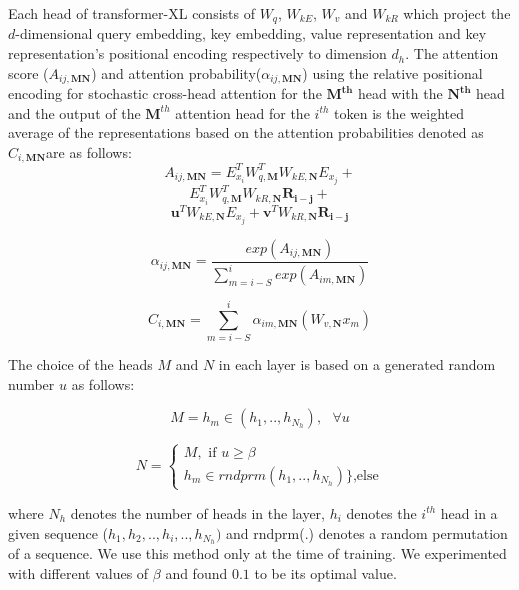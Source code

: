 \documentclass[11pt]{article}
\begin{document}
Each head of transformer-XL consists of $W_q$, $W_{kE}$, $W_v$ and $W_{kR}$ which project the $d$-dimensional query embedding, key embedding, value representation and key representation's positional encoding respectively to dimension $d_h$. The attention score ($A_{ij,\textbf{M}\textbf{N}}$) and attention probability($\alpha_{ij, \textbf{M}\textbf{N}}$) using the relative positional encoding for stochastic cross-head attention for the $\mathbf{M^{th}}$ head with the $\mathbf{N^{th}}$ head and the output of the $\textbf{M}^{th}$ attention head for the $i^{th}$ token is the weighted average of the representations based on the attention probabilities denoted as $C_{i, \textbf{M}\textbf{N}}$are as follows:
\[
     A_{ij,\textbf{M}\textbf{N}}  =  E_{x_i}^{T} W_{q, \textbf{M}}^{T} W_{kE, \textbf{N}} E_{x_j} +
\]
\[
     E_{x_i}^{T} W_{q, \textbf{M}}^{T} W_{kR, \textbf{N}} \mathbf{R_{i-j}} + 
\]
\begin{equation}
\label{eqn:chattn}
     \mathbf{u}^{T}  W_{kE, \textbf{N}} E_{x_j} + \mathbf{v}^{T} W_{kR, \textbf{N}}\mathbf{R_{i-j}}    
\end{equation}



\[
    \alpha_{ij, \textbf{M}\textbf{N}}= \frac{exp( A_{ij, \textbf{M}\textbf{N}} )}{\sum_{m= i-S}^{i} exp( A_{im, \textbf{M}\textbf{N}} )}
\]


\begin{equation}
\label{eqn:modified_attention_output}
C_{i, \textbf{M}\textbf{N}} = \sum_{m= i-S}^{i} \alpha_{im, \textbf{M}\textbf{N}} (W_{v,\textbf{N}}  x_{m})
\end{equation}




The choice of the heads $M$ and $N$ in each layer is based on a generated random number $u$ as follows:





\[ 
    M = h_m \in (h_1 ,. . ,  h_{N_h}) , \text{ } \forall u
\]

\begin{equation}
\label{eqn:beta}
    N= 
    \begin{cases}
        M ,  \text{ if  } u \geq \beta \\
        h_m \in rndprm(h_1,. . ,  h_{N_h})\}  \text{,else}
    \end{cases}
\end{equation}
 



where $N_h$ denotes the number of heads in the layer, $h_i$ denotes the $i^{th}$ head in a given sequence ($h_1, h_2,.., h_i, .., h_{N_h})$ and rndprm(.) denotes a random permutation of a sequence. We use this method only at the time of training. We experimented with different values of $\beta$ and found $0.1$ to be its optimal value.
\end{document}

